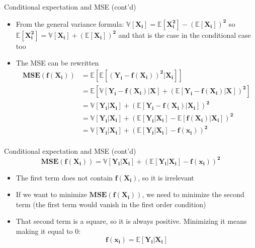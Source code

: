 \documentclass[
  ignorenonframetext,
  aspectratio=169]{beamer}
\providecommand{\tightlist}{%
  \setlength{\itemsep}{0pt}\setlength{\parskip}{0pt}}
\begin{document}
\begin{frame}{Conditional expectation and MSE (cont'd)}
\protect\hypertarget{conditional-expectation-and-mse-contd}{}
\begin{itemize}
\tightlist
\item
  From the general variance formula:
  \(\bm{\mathbb{V}[X_i] = \mathbb{E}[X_i^2] - (\mathbb{E}[X_i])^2}\) so
  \(\bm{ \mathbb{E}[X_i^2] = \mathbb{V}[X_i] + (\mathbb{E}[X_i])^2}\)
  and that is the case in the conditional case too
\item
  The MSE can be rewritten \begin{align*}
  \bm{MSE(f(X_i))} & \bm{= \mathbb{E} \left[ \mathbb{E} [(Y_i - f(X_i))^2|X_i]\right] }\\
                 & \bm{= \mathbb{E} \left[ \mathbb{V} [Y_i - f(X_i)|X] + (\mathbb{E}[Y_i - f(X_i)|X])^2 \right] } \\
                 & \bm{= \mathbb{V} [Y_i |X_i] + (\mathbb{E}[Y_i - f(X_i)|X_i])^2}  \\
                 & \bm{= \mathbb{V} [Y_i |X_i] + (\mathbb{E}[Y_i|X_i] - \mathbb{E}[f(X_i)|X_i])^2} \\
                 & \bm{= \mathbb{V} [Y_i |X_i] + (\mathbb{E}[Y_i|X_i] - f(x_i))^2 }\\
  \end{align*}
\end{itemize}
\end{frame}

\begin{frame}{Conditional expectation and MSE (cont'd)}
\protect\hypertarget{conditional-expectation-and-mse-contd-1}{}
\[
\bm{MSE(f(X_i)) = \mathbb{V} [Y_i |X_i] + (\mathbb{E}[Y_i|X_i] - f(x_i))^2 }
\]

\begin{itemize}
\tightlist
\item
  The first term does not contain \(\bm{f(X_i)}\), so it is irrelevant
\item
  If we want to minimize \(\bm{MSE(f(X_i))}\), we need to minimize the
  second term (the first term would vanish in the first order condition)
\item
  That second term is a square, so it is always positive. Minimizing it
  means making it equal to 0: \[
  \bm{f(x_i) = \mathbb{E}[Y_i|X_i]}
  \]
\end{itemize}
\end{frame}
\end{document}
